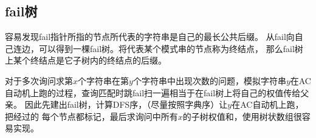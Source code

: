 \subsection{fail树}
容易发现fail指针所指的节点所代表的字符串是自己的最长公共后缀。
从fail向自己连边，可以得到一棵fail树。将代表某个模式串的节点称为终结点，
那么fail树上某个终结点是它子树内的终结点的后缀。

对于多次询问求第$x$个字符串在第$y$个字符串中出现次数的问题，模拟字符串$y$在AC
自动机上跑的过程，查询匹配时跳fail扫一遍相当于在fail树上将自己的权值传给父亲。
因此先建出fail树，计算DFS序，（尽量按照字典序）让$y$在AC自动机上跑，把经过的
每个节点都标记，最后求询问中所有$x$的子树权值和，使用树状数组很容易实现。
